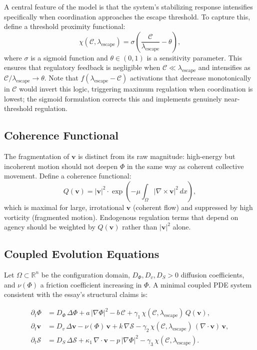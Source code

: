 \documentclass[11pt, a4paper]{article}
\begin{document}
A central feature of the model is that the system's stabilizing response intensifies specifically when coordination approaches the escape threshold. To capture this, define a threshold proximity functional:
\begin{equation}
\chi(\mathcal{C}, \lambda_{\mathrm{escape}}) = \sigma\!\left(\frac{\mathcal{C}}{\lambda_{\mathrm{escape}}} - \theta\right),
\end{equation}
where $\sigma$ is a sigmoid function and $\theta \in (0,1)$ is a sensitivity parameter. This ensures that regulatory feedback is negligible when $\mathcal{C} \ll \lambda_{\mathrm{escape}}$ and intensifies as $\mathcal{C}/\lambda_{\mathrm{escape}} \to \theta$. Note that $f(\lambda_{\mathrm{escape}} - \mathcal{C})$ activations that decrease monotonically in $\mathcal{C}$ would invert this logic, triggering maximum regulation when coordination is lowest; the sigmoid formulation corrects this and implements genuinely near-threshold regulation.

\subsection{Coherence Functional}

The fragmentation of $\mathbf{v}$ is distinct from its raw magnitude: high-energy but incoherent motion should not deepen $\Phi$ in the same way as coherent collective movement. Define a coherence functional:
\begin{equation}
Q(\mathbf{v}) = |\mathbf{v}|^2 \cdot \exp\!\left(-\mu \int_\Omega |\nabla \times \mathbf{v}|^2 \, dx\right),
\end{equation}
which is maximal for large, irrotational $\mathbf{v}$ (coherent flow) and suppressed by high vorticity (fragmented motion). Endogenous regulation terms that depend on agency should be weighted by $Q(\mathbf{v})$ rather than $|\mathbf{v}|^2$ alone.

\subsection{Coupled Evolution Equations}

Let $\Omega \subset \mathbb{R}^n$ be the configuration domain, $D_\Phi, D_v, D_S > 0$ diffusion coefficients, and $\nu(\Phi)$ a friction coefficient increasing in $\Phi$. A minimal coupled PDE system consistent with the essay's structural claims is:

\begin{align}
\partial_t \Phi &= D_\Phi \,\Delta \Phi
  + a\,|\nabla \Phi|^2
  - b\,\mathcal{C}
  + \gamma_1\,\chi(\mathcal{C},\lambda_{\mathrm{escape}})\,Q(\mathbf{v}), \\[0.8em]
\partial_t \mathbf{v} &= D_v \,\Delta \mathbf{v}
  - \nu(\Phi)\,\mathbf{v}
  + k\,\nabla \mathcal{S}
  - \gamma_2\,\chi(\mathcal{C},\lambda_{\mathrm{escape}})\,(\nabla \cdot \mathbf{v})\,\mathbf{v}, \\[0.8em]
\partial_t \mathcal{S} &= D_S \,\Delta \mathcal{S}
  + \kappa_1\,\nabla \cdot \mathbf{v}
  - p\,|\nabla \Phi|^2
  - \gamma_3\,\chi(\mathcal{C},\lambda_{\mathrm{escape}}).
\end{align}
\end{document}
